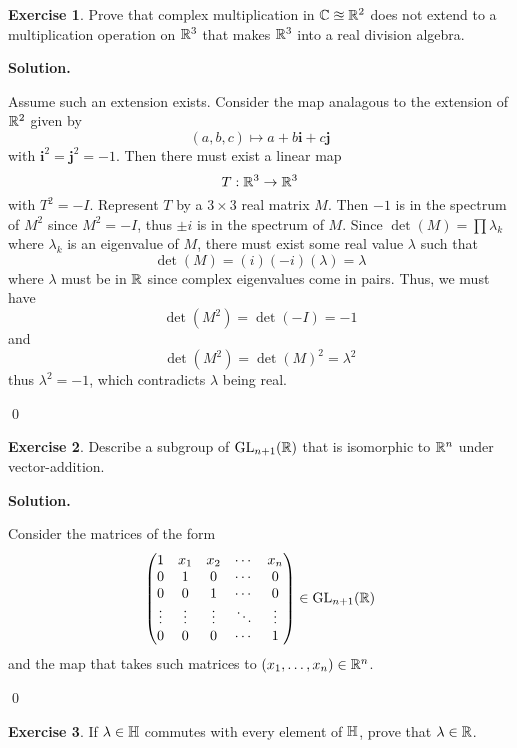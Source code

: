 \documentclass[12pt]{book}
\theoremstyle{definition}
\newtheorem{exercise}{Exercise}[chapter]
\newenvironment{solution}
{%
  \par\noindent\textbf{Solution.}\quad
}
{%
  \qed\par
}
\begin{document}
\begin{exercise}
  Prove that complex multiplication in $\mathbb{C} \approxeq \mathbb{R}^2$ does not extend to a multiplication operation on $\mathbb{R}^3$ that makes $\mathbb{R}^3$ into a real division algebra.
\end{exercise}

\begin{solution}
  Assume such an extension exists. 
  Consider the map analagous to the extension of $\mathbb{R}^2$ given by
  \[
  (a,b,c) \mapsto a + b\mathbf{i} + c \mathbf{j}
  \]
  with $\mathbf{i}^2 = \mathbf{j}^2 = -1$. 
  Then there must exist a linear map 
  \[
  T: \mathbb{R}^3 \to \mathbb{R}^3
  \]
  with $T^2 = -I$. 
  Represent $T$ by a $3 \times 3$ real matrix $M$. 
  Then $-1$ is in the spectrum of $M^2$ since $M^2 = -I$, thus $\pm i$ is in the spectrum of $M$.
  Since $\det(M) = \prod \lambda_k$ where $\lambda_k$ is an eigenvalue of $M$, there must exist some real value $\lambda$ such that
  \[
  \det(M) = (i)(-i)(\lambda) = \lambda
  \]
  where $\lambda$ must be in $\mathbb{R}$ since complex eigenvalues come in pairs.
  Thus, we must have
  \[
  \det(M^2) = \det(-I) = -1
  \]
  and
  \[
  \det(M^2) = \det(M)^2 = \lambda^2
  \]
  thus $\lambda^2 = -1$, which contradicts $\lambda$ being real.
  
\end{solution}

\begin{exercise}
  Describe a subgroup of $\mathrm{GL}_{n+1}(\mathbb{R})$ that is isomorphic to $\mathbb{R}^n$ under vector-addition.
\end{exercise}

\begin{solution}
  Consider the matrices of the form 
  \[
  \begin{pmatrix}
  1      & x_1    & x_2    & \cdots & x_n \\
  0      & 1      & 0      & \cdots & 0   \\
  0      & 0      & 1      & \cdots & 0   \\
  \vdots & \vdots & \vdots & \ddots & \vdots \\
  0      & 0      & 0      & \cdots & 1
  \end{pmatrix} \in \mathrm{GL}_{n+1}(\mathbb{R})
  \]
  and the map that takes such matrices to $(x_1, \dots , x_n) \in \mathbb{R}^n$.

\end{solution}

\begin{exercise}
  If $\lambda \in \mathbb{H}$ commutes with every element of $\mathbb{H}$, prove that $\lambda \in \mathbb{R}$.
\end{exercise}
\end{document}
